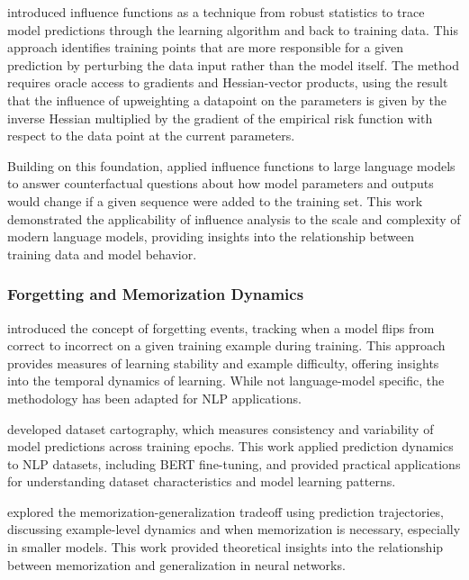 \citet{koh2017understanding} introduced influence functions as a technique from robust statistics to trace model predictions through the learning algorithm and back to training data. This approach identifies training points that are more responsible for a given prediction by perturbing the data input rather than the model itself. The method requires oracle access to gradients and Hessian-vector products, using the result that the influence of upweighting a datapoint on the parameters is given by the inverse Hessian multiplied by the gradient of the empirical risk function with respect to the data point at the current parameters.

Building on this foundation, \citet{grosse2023influence} applied influence functions to large language models to answer counterfactual questions about how model parameters and outputs would change if a given sequence were added to the training set. This work demonstrated the applicability of influence analysis to the scale and complexity of modern language models, providing insights into the relationship between training data and model behavior.

\subsubsection{Forgetting and Memorization Dynamics}

\citet{toneva2019empirical} introduced the concept of forgetting events, tracking when a model flips from correct to incorrect on a given training example during training. This approach provides measures of learning stability and example difficulty, offering insights into the temporal dynamics of learning. While not language-model specific, the methodology has been adapted for NLP applications.

\citet{swayamdipta2020dataset} developed dataset cartography, which measures consistency and variability of model predictions across training epochs. This work applied prediction dynamics to NLP datasets, including BERT fine-tuning, and provided practical applications for understanding dataset characteristics and model learning patterns.

\citet{feldman2020does} explored the memorization-generalization tradeoff using prediction trajectories, discussing example-level dynamics and when memorization is necessary, especially in smaller models. This work provided theoretical insights into the relationship between memorization and generalization in neural networks.


